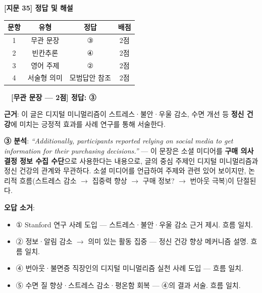 \documentclass[11pt,a4paper]{article}
\newcommand{\qno}[1]{\par\vspace{10pt}\noindent{\sffamily\bfseries #1.}\ }
\begin{document}
\begin{center}
{\fontsize{15}{17}\selectfont\sffamily\bfseries [지문 35] 정답 및 해설}
\end{center}
\vspace{6pt}

\begin{center}
\begin{tabular}{cccc}
\toprule
\textbf{문항} & \textbf{유형} & \textbf{정답} & \textbf{배점} \\
\midrule
1 & 무관 문장 & ③ & 2점 \\
2 & 빈칸추론 & ④ & 2점 \\
3 & 영어 주제 & ② & 2점 \\
4 & 서술형 의미 & 모범답안 참조 & 2점 \\
\bottomrule
\end{tabular}
\end{center}

\bigskip

\qno{1}\ \textbf{[무관 문장 --- 2점] 정답: ③}

\vspace{4pt}
\noindent\textbf{근거}: 이 글은 디지털 미니멀리즘이 스트레스·불안·우울 감소, 수면 개선 등 \textbf{정신 건강}에 미치는 긍정적 효과를 사례 연구를 통해 서술한다.

\vspace{4pt}
\noindent\textbf{③ 분석}: \textit{``Additionally, participants reported relying on social media to get information for their purchasing decisions.''} --- 이 문장은 소셜 미디어를 \textbf{구매 의사결정 정보 수집 수단}으로 사용한다는 내용으로, 글의 중심 주제인 디지털 미니멀리즘과 정신 건강의 관계와 무관하다. 소셜 미디어를 언급하여 주제와 관련 있어 보이지만, 논리적 흐름(스트레스 감소 $\to$ 집중력 향상 $\to$ 구매 정보? $\to$ 번아웃 극복)이 단절된다.

\vspace{6pt}
\noindent\textbf{오답 소거}:
\begin{itemize}[leftmargin=2em,itemsep=1pt,topsep=2pt]
  \item ① Stanford 연구 사례 도입 --- 스트레스·불안·우울 감소 근거 제시. 흐름 일치.
  \item ② 정보·알림 감소 $\to$ 의미 있는 활동 집중 --- 정신 건강 향상 메커니즘 설명. 흐름 일치.
  \item ④ 번아웃·불면증 직장인의 디지털 미니멀리즘 실천 사례 도입 --- 흐름 일치.
  \item ⑤ 수면 질 향상·스트레스 감소·평온함 회복 --- ④의 결과 서술. 흐름 일치.
\end{itemize}
\end{document}
